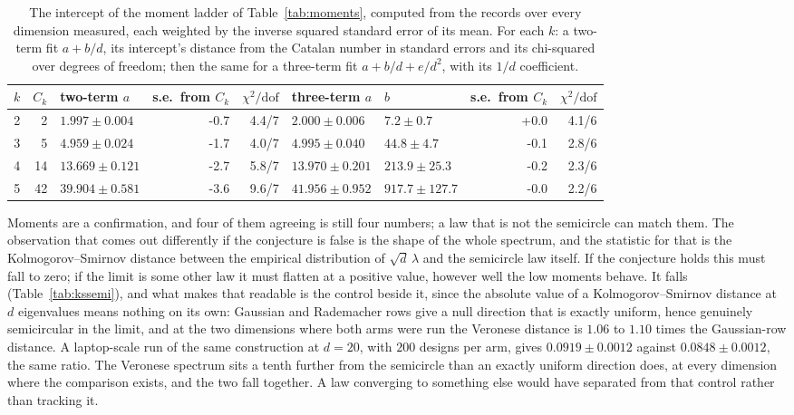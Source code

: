 \documentclass[11pt]{article}
\theoremstyle{definition}
\newcommand{\numKsRatioMax}{1.10}
\newcommand{\numKsRatioMin}{1.06}
\begin{document}
\begin{table}[t]
\centering\small
\caption{The intercept of the moment ladder of Table~\ref{tab:moments}, computed from the records
over every dimension measured, each weighted by the inverse squared standard error of its mean. For
each $k$: a two-term fit $a+b/d$, its intercept's distance from the Catalan number in standard
errors and its chi-squared over degrees of freedom; then the same for a three-term fit
$a+b/d+e/d^2$, with its $1/d$ coefficient.}
\label{tab:momentfit}
{\setlength{\tabcolsep}{4.5pt}
\begin{tabular}{rrlrrllrr}
\toprule
$k$ & $C_k$ & two-term $a$ & s.e.\ from $C_k$ & $\chi^2/\mathrm{dof}$ & three-term $a$ & $b$ &
s.e.\ from $C_k$ & $\chi^2/\mathrm{dof}$\\
\midrule
2 & 2 & $1.997\pm0.004$ & -0.7 & 4.4/7 & $2.000\pm0.006$ & $7.2\pm0.7$ & +0.0 & 4.1/6\\
3 & 5 & $4.959\pm0.024$ & -1.7 & 4.0/7 & $4.995\pm0.040$ & $44.8\pm4.7$ & -0.1 & 2.8/6\\
4 & 14 & $13.669\pm0.121$ & -2.7 & 5.8/7 & $13.970\pm0.201$ & $213.9\pm25.3$ & -0.2 & 2.3/6\\
5 & 42 & $39.904\pm0.581$ & -3.6 & 9.6/7 & $41.956\pm0.952$ & $917.7\pm127.7$ & -0.0 & 2.2/6\\
\bottomrule
\end{tabular}}
\end{table}

Moments are a confirmation, and four of them agreeing is still four numbers; a law that is not the
semicircle can match them. The observation that comes out differently if the conjecture is false is
the shape of the whole spectrum, and the statistic for that is the Kolmogorov--Smirnov distance
between the empirical distribution of $\sqrt d\,\lambda$ and the semicircle law itself. If the conjecture
holds this must fall to zero; if the limit is some other law it must flatten at a positive value,
however well the low moments behave. It falls (Table~\ref{tab:kssemi}), and what makes that readable
is the control beside it, since the absolute value of a Kolmogorov--Smirnov distance at $d$
eigenvalues means nothing on its own: Gaussian and Rademacher rows give a null direction that is
exactly uniform, hence genuinely semicircular in the limit, and at the two dimensions where both arms
were run the Veronese distance is $\numKsRatioMin$ to $\numKsRatioMax$ times the Gaussian-row
distance. A laptop-scale run of the same construction at $d=20$, with $200$ designs per arm, gives
$0.0919\pm0.0012$ against $0.0848\pm0.0012$, the same ratio. The Veronese spectrum sits a tenth
further from the semicircle than an exactly uniform direction does, at every dimension where the
comparison exists, and the two fall together. A law converging to something else would have separated
from that control rather than tracking it.
\end{document}

